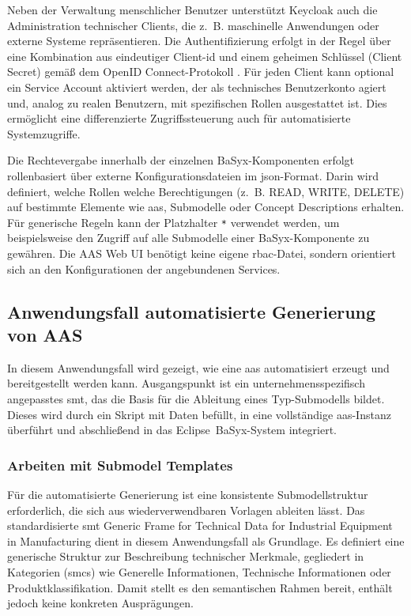Neben der Verwaltung menschlicher Benutzer unterstützt Keycloak auch die Administration technischer Clients, die z.~B. maschinelle Anwendungen oder externe Systeme repräsentieren.  
Die Authentifizierung erfolgt in der Regel über eine Kombination aus eindeutiger Client-\acs{id} und einem geheimen Schlüssel (Client Secret) gemäß dem OpenID Connect-Protokoll \cite{OpenID}.  
Für jeden Client kann optional ein Service Account aktiviert werden, der als technisches Benutzerkonto agiert und, analog zu realen Benutzern, mit spezifischen Rollen ausgestattet ist.  
Dies ermöglicht eine differenzierte Zugriffssteuerung auch für automatisierte Systemzugriffe.

Die Rechtevergabe innerhalb der einzelnen BaSyx-Komponenten erfolgt rollenbasiert über externe Konfigurationsdateien im \acs{json}-Format.  
Darin wird definiert, welche Rollen welche Berechtigungen (z.~B. READ, WRITE, DELETE) auf bestimmte Elemente wie \acs{aas}, Submodelle oder Concept Descriptions erhalten.  
Für generische Regeln kann der Platzhalter \texttt{*} verwendet werden, um beispielsweise den Zugriff auf alle Submodelle einer BaSyx-Komponente zu gewähren.  
Die AAS Web UI benötigt keine eigene \acs{rbac}-Datei, sondern orientiert sich an den Konfigurationen der angebundenen Services.

\subsection{Anwendungsfall automatisierte Generierung von AAS}
In diesem Anwendungsfall wird gezeigt, wie eine \acs{aas} automatisiert erzeugt und bereitgestellt werden kann.  
Ausgangspunkt ist ein unternehmensspezifisch angepasstes \acs{smt}, das die Basis für die Ableitung eines Typ-Submodells bildet.
Dieses wird durch ein Skript mit Daten befüllt, in eine vollständige \acs{aas}-Instanz überführt und abschließend in das \mbox{Eclipse BaSyx-System} integriert.

\subsubsection{Arbeiten mit Submodel Templates}
\label{chap:ErstellenvonSubmodelTemplates}
Für die automatisierte Generierung ist eine konsistente Submodellstruktur erforderlich, die sich aus wiederverwendbaren Vorlagen ableiten lässt.
Das standardisierte \acs{smt} \mbox{Generic} \mbox{Frame} \mbox{for} \mbox{Technical} \mbox{Data} \mbox{for} \mbox{Industrial} \mbox{Equipment} \mbox{in} \mbox{Manufacturing} \cite{SpezifikaitonTechnischeDaten} dient in diesem Anwendungsfall als Grundlage.
Es definiert eine generische Struktur zur Beschreibung technischer Merkmale, gegliedert in Kategorien (\acsp{smc}) wie Generelle Informationen, Technische Informationen oder \mbox{Produktklassifikation}.
Damit stellt es den semantischen Rahmen bereit, enthält jedoch keine konkreten Ausprägungen.

